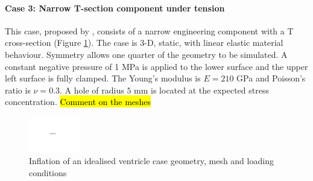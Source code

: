 \documentclass[sn-mathphys,Numbered]{sn-jnl}%
\begin{document}
\paragraph{Case 3: Narrow T-section component under tension}
This case, proposed by \citet{Demirdzic1997}, consists of a narrow engineering component with a T cross-section (Figure \ref{fig:narrowTmember}).
The case is 3-D, static, with linear elastic material behaviour.
Symmetry allows one quarter of the geometry to be simulated.
A constant negative pressure of 1 MPa is applied to the lower surface and the upper left surface is fully clamped.
The Young’s modulus is $E = 210$ GPa and Poisson’s ratio is $\nu = 0.3$.
A hole of radius $5$ mm is located at the expected stress concentration.
\hl{Comment on the meshes}
\begin{figure}[htbp]
   \centering
   \includegraphics[width=0.2\textwidth]{figures/placeholder.pdf} 
   \caption{Inflation of an idealised ventricle case geometry, mesh and loading conditions}
   \label{fig:narrowTmember}
\end{figure}
\end{document}
